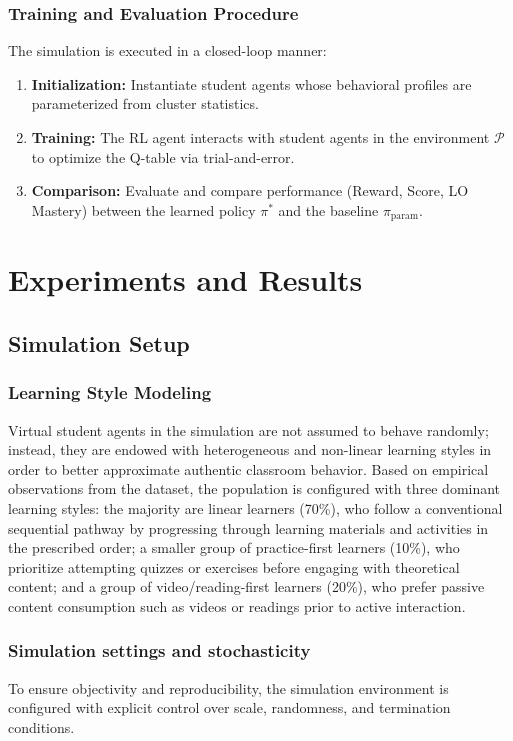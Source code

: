 \documentclass[9pt, conference, a4paper, compsocconf]{IEEEtran}
\begin{document}
\subsubsection{Training and Evaluation Procedure}
The simulation is executed in a closed-loop manner:
\begin{enumerate}
    \item \textbf{Initialization:} Instantiate student agents whose behavioral profiles are parameterized from cluster statistics.
    \item \textbf{Training:} The RL agent interacts with student agents in the environment $\mathcal{P}$ to optimize the Q-table via trial-and-error.
    \item \textbf{Comparison:} Evaluate and compare performance (Reward, Score, LO Mastery) between the learned policy $\pi^*$ and the baseline $\pi_{\text{param}}$.
\end{enumerate}

\section{Experiments and Results}
\label{sec:experiments}

\subsection{Simulation Setup}

\subsubsection{Learning Style Modeling}
Virtual student agents in the simulation are not assumed to behave randomly; instead, they are endowed with heterogeneous and non-linear learning styles in order to better approximate authentic classroom behavior. Based on empirical observations from the dataset, the population is configured with three dominant learning styles: the majority are linear learners (70\%), who follow a conventional sequential pathway by progressing through learning materials and activities in the prescribed order; a smaller group of practice-first learners (10\%), who prioritize attempting quizzes or exercises before engaging with theoretical content; and a group of video/reading-first learners (20\%), who prefer passive content consumption such as videos or readings prior to active interaction.

\subsubsection{Simulation settings and stochasticity}
To ensure objectivity and reproducibility, the simulation environment is configured with explicit control over scale, randomness, and termination conditions.
\end{document}
